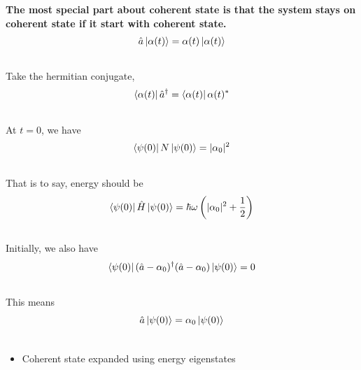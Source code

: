 \documentclass[letterpaper,10pt,english]{sphinxmanual}
\begin{document}
\textbf{The most special part about coherent state is that the system stays on coherent state if it start with coherent state.}
\begin{gather}
\begin{split}\hat a \left| \alpha(t)\right\rangle = \alpha(t) \left| \alpha(t)\right\rangle\end{split}\notag\\\begin{split}\end{split}\notag
\end{gather}
Take the hermitian conjugate,
\begin{gather}
\begin{split}\left\langle \alpha(t)\right| \hat a^\dagger  = \left\langle \alpha(t)\right|\alpha(t)^*\end{split}\notag\\\begin{split}\end{split}\notag
\end{gather}
At $t=0$, we have
\begin{gather}
\begin{split}\left\langle \psi(0)\right| N \left| \psi(0)\right\rangle = \vert \alpha_0 \vert ^2\end{split}\notag\\\begin{split}\end{split}\notag
\end{gather}
That is to say, energy should be
\begin{gather}
\begin{split}\left\langle \psi(0)\right| \hat H \left| \psi(0)\right\rangle = \hbar \omega \left( \vert \alpha_0 \vert^2 + \frac{1}{2} \right)\end{split}\notag\\\begin{split}\end{split}\notag
\end{gather}
Initially, we also have
\begin{gather}
\begin{split}\left\langle \psi(0)\right| (\hat a - \alpha_0)^\dagger (\hat a-\alpha_0) \left| \psi(0)\right\rangle = 0\end{split}\notag\\\begin{split}\end{split}\notag
\end{gather}
This means
\begin{gather}
\begin{split}\hat a \left| \psi(0)\right\rangle = \alpha_0 \left| \psi(0)\right\rangle\end{split}\notag\\\begin{split}\end{split}\notag
\end{gather}\begin{itemize}
\item {} 
Coherent state expanded using energy eigenstates

\end{itemize}
\end{document}
